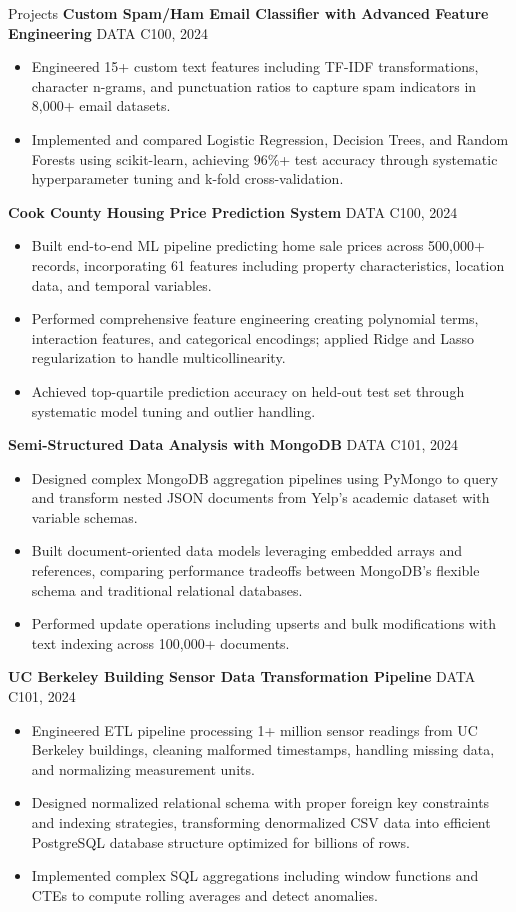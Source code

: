 \documentclass{resume}
\begin{document}
\begin{rSection}{Projects}
\textbf{Custom Spam/Ham Email Classifier with Advanced Feature Engineering} \hfill DATA C100, 2024
\begin{itemize}
  \item Engineered 15+ custom text features including TF-IDF transformations, character n-grams, and punctuation ratios to capture spam indicators in 8,000+ email datasets.
  \item Implemented and compared Logistic Regression, Decision Trees, and Random Forests using scikit-learn, achieving 96\%+ test accuracy through systematic hyperparameter tuning and k-fold cross-validation.
\end{itemize}

\textbf{Cook County Housing Price Prediction System} \hfill DATA C100, 2024
\begin{itemize}
  \item Built end-to-end ML pipeline predicting home sale prices across 500,000+ records, incorporating 61 features including property characteristics, location data, and temporal variables.
  \item Performed comprehensive feature engineering creating polynomial terms, interaction features, and categorical encodings; applied Ridge and Lasso regularization to handle multicollinearity.
  \item Achieved top-quartile prediction accuracy on held-out test set through systematic model tuning and outlier handling.
\end{itemize}

\textbf{Semi-Structured Data Analysis with MongoDB} \hfill DATA C101, 2024
\begin{itemize}
  \item Designed complex MongoDB aggregation pipelines using PyMongo to query and transform nested JSON documents from Yelp's academic dataset with variable schemas.
  \item Built document-oriented data models leveraging embedded arrays and references, comparing performance tradeoffs between MongoDB's flexible schema and traditional relational databases.
  \item Performed update operations including upserts and bulk modifications with text indexing across 100,000+ documents.
\end{itemize}

\textbf{UC Berkeley Building Sensor Data Transformation Pipeline} \hfill DATA C101, 2024
\begin{itemize}
  \item Engineered ETL pipeline processing 1+ million sensor readings from UC Berkeley buildings, cleaning malformed timestamps, handling missing data, and normalizing measurement units.
  \item Designed normalized relational schema with proper foreign key constraints and indexing strategies, transforming denormalized CSV data into efficient PostgreSQL database structure optimized for billions of rows.
  \item Implemented complex SQL aggregations including window functions and CTEs to compute rolling averages and detect anomalies.
\end{itemize}


\end{rSection}
\end{document}
